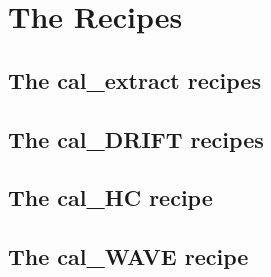 \chapter{The Recipes}
\label{ch:the_recipes}














\clearpage
\newpage
\section{The cal\_extract recipes}
\label{ch:the_recipes:cal_extract_RAW_spirou}


\clearpage
\newpage
\section{The cal\_DRIFT recipes}
\label{ch:the_recipes:cal_DRIFT_RAW_spirou}



\clearpage
\newpage
\section{The cal\_HC recipe}
\label{ch:the_recipes:cal_HC_E2DS_spirou}



\clearpage
\newpage
\section{The cal\_WAVE recipe}
\label{ch:the_recipes:cal_WAVE_E2DS_spirou}



